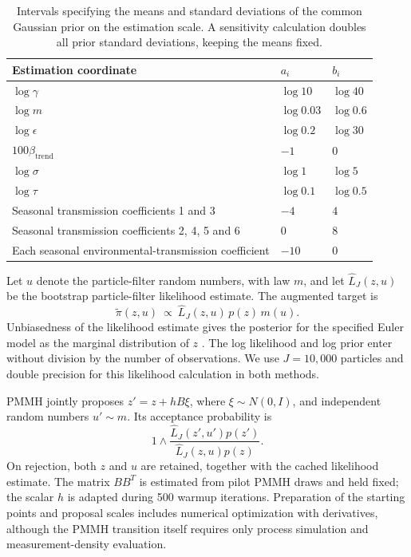 \documentclass[11pt]{article}
\theoremstyle{thmstylethree}%
\begin{document}
\begin{table}[htbp]
\centering
\begin{tabular}{lll}
\toprule
Estimation coordinate & $a_i$ & $b_i$ \\
\midrule
$\log\gamma$ & $\log 10$ & $\log 40$ \\
$\log m$ & $\log 0.03$ & $\log 0.6$ \\
$\log\epsilon$ & $\log 0.2$ & $\log 30$ \\
$100\beta_{\mathrm{trend}}$ & $-1$ & $0$ \\
$\log\sigma$ & $\log 1$ & $\log 5$ \\
$\log\tau$ & $\log 0.1$ & $\log 0.5$ \\
Seasonal transmission coefficients 1 and 3 & $-4$ & $4$ \\
Seasonal transmission coefficients 2, 4, 5 and 6 & $0$ & $8$ \\
Each seasonal environmental-transmission coefficient & $-10$ & $0$ \\
\bottomrule
\end{tabular}
\caption{Intervals specifying the means and standard deviations of the
common Gaussian prior on the estimation scale. A sensitivity calculation
doubles all prior standard deviations, keeping the means fixed.}
\label{tab:bayes-prior}
\end{table}

Let $u$ denote the particle-filter random numbers, with law $m$, and let
$\widehat L_J(z,u)$ be the bootstrap particle-filter likelihood estimate.
The augmented target is
\begin{equation}
 \widetilde\pi(z,u)\ \propto\ \widehat L_J(z,u)\,p(z)\,m(u).
 \label{eq:bayes-common-target}
\end{equation}
Unbiasedness of the likelihood estimate gives the posterior for the
specified Euler model as the marginal distribution of $z$ \citep{andrieu10}.
The log likelihood and log prior enter without division by the number of
observations. We use $J=10,000$ particles and double precision for this
likelihood calculation in both methods.

PMMH jointly proposes $z'=z+hB\xi$, where $\xi\sim N(0,I)$, and independent
random numbers $u'\sim m$. Its acceptance probability is
\[
 1\wedge\frac{\widehat L_J(z',u')p(z')}{\widehat L_J(z,u)p(z)}.
\]
On rejection, both $z$ and $u$ are retained, together with the cached
likelihood estimate. The matrix $BB^T$ is estimated from pilot PMMH draws
and held fixed; the scalar $h$ is adapted during 500 warmup iterations.
Preparation of the starting points and proposal scales includes numerical
optimization with derivatives, although the PMMH transition itself
requires only process simulation and measurement-density evaluation.
\end{document}
